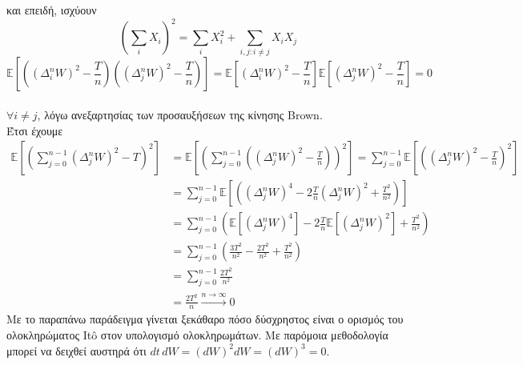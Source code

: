 \documentclass[12pt,a4paper,twoside,openany]{book}
\begin{document}
	 
	\noindent και επειδή, ισχύουν 
	\begin{equation*}
		\left( \sum_i X_i \right)^2 = \sum_i X_i^2 + \sum_{i,j: i \neq j} X_i X_j
	\end{equation*}
	\begin{equation*}
		\mathbb{E}\left[\left((\Delta_{i}^n W)^2-\frac{T}{n}\right) \left((\Delta_{j}^n W)^2-\frac{T}{n}\right)\right] = \mathbb{E}\left[(\Delta_{i}^n W)^2-\frac{T}{n}\right] \mathbb{E}\left[(\Delta_{j}^n W)^2-\frac{T}{n}\right] = 0 
	\end{equation*}
	\\
	$\forall i\neq j$, λόγω ανεξαρτησίας των προσαυξήσεων της κίνησης Brown.\\
	\noindent Έτσι έχουμε
	\begin{align*}
		\mathbb{E}\left[\left(\sum_{j=0}^{n-1}(\Delta_{j}^n W)^2 - T  \right)^2 \right] 
		&= \mathbb{E}\left[\left(\sum_{j=0}^{n-1}\left((\Delta_{j}^n W)^2 - \frac{T}{n}\right)\right)^2 \right] 
		= \sum_{j=0}^{n-1}\mathbb{E}\left[\left((\Delta_{j}^n W)^2 - \frac{T}{n} \right)^2\right] \\
		&= \sum_{j=0}^{n-1}\mathbb{E}\left[\left((\Delta_{j}^n W)^4 -2\frac{T}{n}(\Delta_{j}^n W)^2 + \frac{T^2}{n^2} \right)\right] \\
		&= \sum_{j=0}^{n-1}\left(\mathbb{E}[(\Delta_{j}^n W)^4] -2\frac{T}{n}\mathbb{E}[(\Delta_{j}^n W)^2] + \frac{T^2}{n^2} \right) \\
		&= \sum_{j=0}^{n-1}\left(\frac{3T^2}{n^2}-\frac{2T^2}{n^2} + \frac{T^2}{n^2} \right) \\
		&= \sum_{j=0}^{n-1}\frac{2T^2}{n^2}\\
		&= \frac{2T^2}{n} \xrightarrow{\overset{}{n\rightarrow\infty}}0
	\end{align*}
	\endgroup
	Με το παραπάνω παράδειγμα γίνεται ξεκάθαρο πόσο δύσχρηστος είναι ο ορισμός του ολοκληρώματος Itô στον υπολογισμό ολοκληρωμάτων. Με παρόμοια μεθοδολογία μπορεί να δειχθεί αυστηρά ότι $dt \, dW= (dW)^2dW= (dW)^3=0$.
\end{document}
